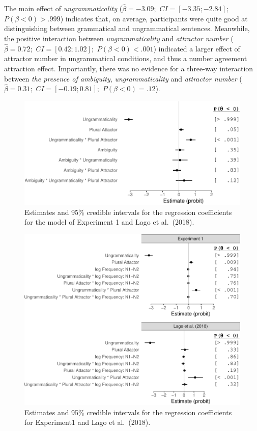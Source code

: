 \documentclass[
  english,
  doc,floatsintext]{apa6}
\begin{document}
The main effect of \textit{ungrammaticality} (\(\hat{\beta}=-3.09;\) \(CI=[-3.35; -2.84];\) \(P(\beta<0)> .999\)) indicates that, on average, participants were quite good at distinguishing between grammatical and ungrammatical sentences. Meanwhile, the positive interaction between \textit{ungrammaticality} and \textit{attractor number} (\(\hat{\beta}=0.72;\) \(CI=[0.42; 1.02];\) \(P(\beta<0)< .001\)) indicated a larger effect of attractor number in ungrammatical conditions, and thus a number agreement attraction effect.
Importantly, there was no evidence for a three-way interaction between \textit{the presence of ambiguity}, \textit{ungrammaticality} and \textit{attractor number} (\(\hat{\beta}=0.31;\) \(CI=[-0.19; 0.81];\) \(P(\beta<0)= .12\)).

\begin{figure}
\centering
\includegraphics{ongoing_paper_files/figure-latex/exp1ResponseModel-1.pdf}
\caption{\label{fig:exp1ResponseModel}Estimates and 95\% credible intervals for the regression coefficients for the model of Experiment 1 and Lago et al.~(2018).}
\end{figure}

\begin{figure}
\centering
\includegraphics{ongoing_paper_files/figure-latex/exp1ResponseModelSepExp1AndLago-1.pdf}
\caption{\label{fig:exp1ResponseModelSepExp1AndLago}Estimates and 95\% credible intervals for the regression coefficients for Experiment1 and Lago et al.~(2018).}
\end{figure}
\end{document}

